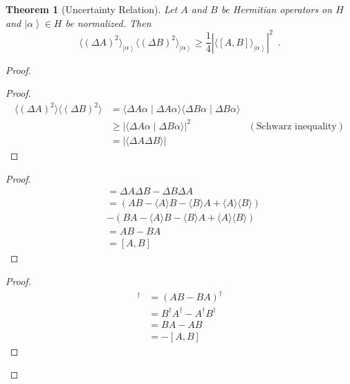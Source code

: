 \documentclass{book}
\newtheorem{thm}[prop]{Theorem}
\theoremstyle{definition}
\newcommand{\ket}[1]{\ensuremath{\left| {#1} \right\rangle}}
\begin{document}
\begin{thm}[Uncertainty Relation]
Let $A$ and $B$ be Hermitian operators on $H$ and $\ket{\alpha} \in H$ be normalized. Then
\[ \langle (\Delta A)^2 \rangle_{\ket{\alpha}} \langle (\Delta B)^2 \rangle_{\ket{\alpha}} \geq \frac{1}{4} |\langle [A,B] \rangle_{\ket{\alpha}}|^2 \enspace . \]
\end{thm}

\begin{proof}
\pf
{}
\begin{proof}
\pf
\begin{align*}
	\langle (\Delta A)^2 \rangle \langle (\Delta B)^2 \rangle
	& = \langle \Delta A \alpha \mid \Delta A \alpha \rangle \langle \Delta B \alpha \mid \Delta B \alpha \rangle \\
	& \geq |\langle \Delta A \alpha \mid \Delta B \alpha \rangle|^2 & (\text{Schwarz inequality}) 	\\
	& = |\langle \Delta A \Delta B \rangle|
\end{align*}
\end{proof}
\begin{proof}
	\pf
	\begin{align*}
		[\Delta A, \Delta B] & = \Delta A \Delta B - \Delta B \Delta A \\
		& = (AB - \langle A \rangle B - \langle B \rangle A + \langle A \rangle \langle B \rangle) \\
		& - (BA - \langle A \rangle B - \langle B \rangle A + \langle A \rangle \langle B \rangle) \\
		& = AB - BA \\
		& = [A,B]
	\end{align*}
\end{proof}
\begin{proof}
	\pf
	\begin{align*}
		[A,B]^\dagger & = (AB - BA)^\dagger \\
		& = B^\dagger A^\dagger - A^\dagger B^\dagger \\
		&= BA - AB \\
		& = -[A,B]
	\end{align*}
\end{proof}

\end{proof}
\end{document}
